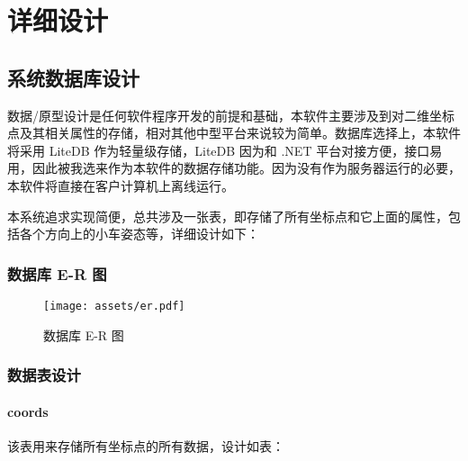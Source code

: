 \section{详细设计}

\subsection{系统数据库设计}

数据/原型设计是任何软件程序开发的前提和基础，本软件主要涉及到对二维坐标点及其相关属性的存储，相对其他中型平台来说较为简单。数据库选择上，本软件将采用 LiteDB 作为轻量级存储，LiteDB 因为和 .NET 平台对接方便，接口易用，因此被我选来作为本软件的数据存储功能。因为没有作为服务器运行的必要，本软件将直接在客户计算机上离线运行。

本系统追求实现简便，总共涉及一张表，即存储了所有坐标点和它上面的属性，包括各个方向上的小车姿态等，详细设计如下：

\subsubsection{数据库 E-R 图}

\begin{figure}[H]
  \centering
  \texttt{[image: assets/er.pdf]}
  \caption{数据库 E-R 图}
  \label{fig:er}
\end{figure}

\subsubsection{数据表设计}

\paragraph{coords}

该表用来存储所有坐标点的所有数据，设计如表：

